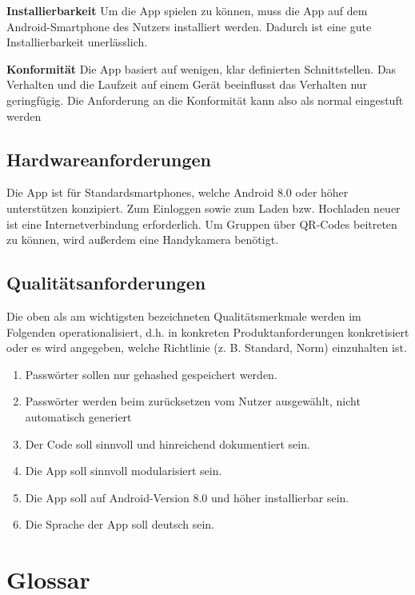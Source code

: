 \documentclass[parskip=full]{scrartcl}
\begin{document}
\textbf{Installierbarkeit}\newline
Um die App spielen zu können, muss die App auf dem Android-Smartphone des Nutzers installiert werden.
Dadurch ist eine gute Installierbarkeit unerlässlich.

\textbf{Konformität}\newline
Die App basiert auf wenigen, klar definierten Schnittstellen. Das Verhalten und die Laufzeit auf einem Gerät beeinflusst das Verhalten nur geringfügig. Die Anforderung an die Konformität kann also als normal eingestuft werden

\subsection{Hardwareanforderungen}
Die App ist für Standardsmartphones, welche Android 8.0 oder höher unterstützen konzipiert. Zum Einloggen sowie zum Laden bzw. Hochladen neuer  ist eine Internetverbindung erforderlich. Um Gruppen über QR-Codes beitreten zu können, wird außerdem eine Handykamera benötigt.


\subsection{Qualitätsanforderungen}
Die oben als am wichtigsten bezeichneten Qualitätsmerkmale werden im Folgenden operationalisiert, d.h. in konkreten Produktanforderungen konkretisiert oder es wird angegeben, welche Richtlinie (z. B. Standard, Norm) einzuhalten ist.

\begin{enumerate}[start=1,label={$\langle$\bfseries Q\arabic*$\rangle$}, leftmargin = 5em, itemsep=4pt, parsep=4pt]
    \item Passwörter sollen nur gehashed gespeichert werden.
    \item Passwörter werden beim zurücksetzen vom Nutzer ausgewählt, nicht automatisch generiert
    \item Der Code soll sinnvoll und hinreichend dokumentiert sein.
    \item Die App soll sinnvoll modularisiert sein.
    \item Die App soll auf Android-Version 8.0 und höher installierbar sein.
    \item Die Sprache der App soll deutsch sein.
\end{enumerate}

\section{Glossar}
\printglossary[type=\acronymtype]
\end{document}
